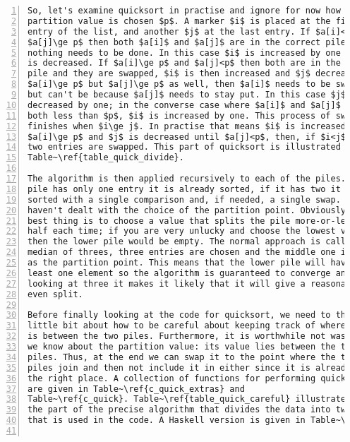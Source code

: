 \documentclass[11pt,a4paper]{scrartcl}
\begin{document}
\begin{table}
\begin{lstlisting}[numbers=left]
So, let's examine quicksort in practise and ignore for now how the
partition value is chosen $p$. A marker $i$ is placed at the first
entry of the list, and another $j$ at the last entry. If $a[i]<p$ and
$a[j]\ge p$ then both $a[i]$ and $a[j]$ are in the correct pile and
nothing needs to be done. In this case $i$ is increased by one and $j$
is decreased. If $a[i]\ge p$ and $a[j]<p$ then both are in the wrong
pile and they are swapped, $i$ is then increased and $j$ decreased. If
$a[i]\ge p$ but $a[j]\ge p$ as well, then $a[i]$ needs to be swapped,
but can't be because $a[j]$ needs to stay put. In this case $j$ is
decreased by one; in the converse case where $a[i]$ and $a[j]$ are
both less than $p$, $i$ is increased by one. This process of swapping
finishes when $i\ge j$. In practise that means $i$ is increased until
$a[i]\ge p$ and $j$ is decreased until $a[j]<p$, then, if $i<j$ the
two entries are swapped. This part of quicksort is illustrated in
Table~\ref{table_quick_divide}.

The algorithm is then applied recursively to each of the piles. If a
pile has only one entry it is already sorted, if it has two it can be
sorted with a single comparison and, if needed, a single swap. We still
haven't dealt with the choice of the partition point. Obviously the
best thing is to choose a value that splits the pile more-or-less in
half each time; if you are very unlucky and choose the lowest value
then the lower pile would be empty. The normal approach is called
median of threes, three entries are chosen and the middle one is used
as the partition point. This means that the lower pile will have at
least one element so the algorithm is guaranteed to converge and, by
looking at three it makes it likely that it will give a reasonably
even split.

Before finally looking at the code for quicksort, we need to think a
little bit about how to be careful about keeping track of where the split
is between the two piles. Furthermore, it is worthwhile not wasting what
we know about the partition value: its value lies between the two
piles. Thus, at the end we can swap it to the point where the two
piles join and then not include it in either since it is already in
the right place. A collection of functions for performing quicksort
are given in Table~\ref{c_quick_extras} and
Table~\ref{c_quick}. Table~\ref{table_quick_careful} illustrates
the part of the precise algorithm that divides the data into two piles
that is used in the code. A Haskell version is given in Table~\ref{haskell_quick}.


\end{lstlisting}
\end{table}
\end{document}
